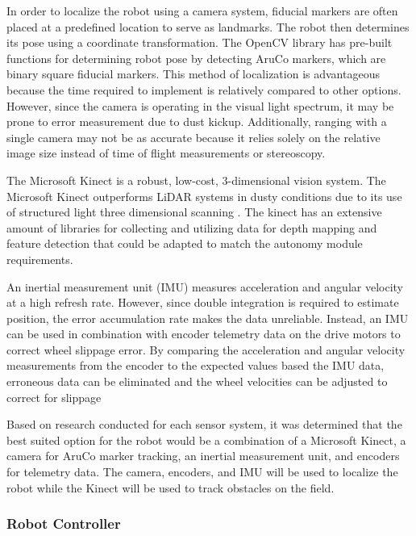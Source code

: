 \documentclass[class=article, crop=false]{standalone}
\begin{document}
	In order to localize the robot using a camera system, fiducial markers are often placed at a predefined location to serve as landmarks. The robot then determines its pose using a coordinate transformation. The OpenCV library has pre-built functions for determining robot pose by detecting AruCo markers, which are binary square fiducial markers. This method of localization is advantageous because the time required to implement is relatively compared to other options. However, since the camera is operating in the visual light spectrum, it may be prone to error measurement due to dust kickup. Additionally, ranging with a single camera may not be as accurate because it relies solely on the relative image size instead of time of flight measurements or stereoscopy.
	
	The Microsoft Kinect is a robust, low-cost, 3-dimensional vision system. The Microsoft Kinect outperforms LiDAR systems in dusty conditions due to its use of structured light three dimensional scanning \cite{kinect}. The kinect has an extensive amount of libraries for collecting and utilizing data for depth mapping and feature detection that could be adapted to match the autonomy module requirements. 
	
	An inertial measurement unit (IMU) measures acceleration and angular velocity at a high refresh rate. However, since double integration is required to estimate position, the error accumulation rate makes the data unreliable. Instead, an IMU can be used in combination with encoder telemetry data on the drive motors to correct wheel slippage error. By comparing the acceleration and angular velocity measurements from the encoder to the expected values based the IMU data, erroneous data can be eliminated and the wheel velocities can be adjusted to correct for slippage
	
	Based on research conducted for each sensor system, it was determined that the best suited option for the robot would be a combination of a Microsoft Kinect, a camera for AruCo marker tracking, an inertial measurement unit, and encoders for telemetry data. The camera, encoders, and IMU will be used to localize the robot while the Kinect will  be used to track obstacles on the field.
	
	\subsubsection{Robot Controller}
	
\end{document}
